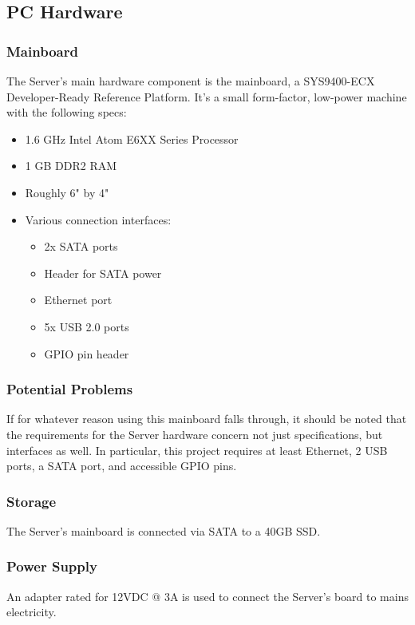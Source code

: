 
\subsection{PC Hardware}

\subsubsection{Mainboard}
The Server's main hardware component is the mainboard, a SYS9400-ECX Developer-Ready Reference Platform. 
It's a small form-factor, low-power machine with the following specs:

\begin{itemize}
	\item 1.6 GHz Intel Atom E6XX Series Processor
	\item 1 GB DDR2 RAM
	\item Roughly 6" by 4"
	\item Various connection interfaces:
	\begin{itemize}
		\item 2x \ac{SATA} ports
		\item Header for \ac{SATA} power
		\item Ethernet port
		\item 5x \ac{USB} 2.0 ports
		\item \ac{GPIO} pin header
	\end{itemize}
\end{itemize}

\subsubsection{Potential Problems}
If for whatever reason using this mainboard falls through, it should be noted that the requirements for the Server hardware concern not just specifications, but interfaces as well.
In particular, this project requires at least Ethernet, 2 \ac{USB} ports, a \ac{SATA} port, and accessible \ac{GPIO} pins.
\subsubsection{Storage}
The Server's mainboard is connected via \ac{SATA} to a 40GB \ac{SSD}.

\subsubsection{Power Supply}
An adapter rated for 12\ac{VDC} @ 3\ac{A} is used to connect the Server's board to mains electricity.
